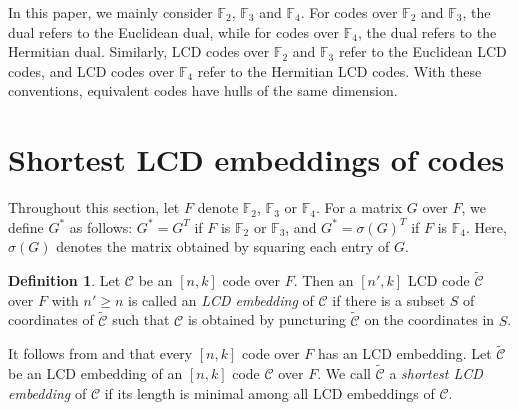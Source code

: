 \documentclass{article}
\theoremstyle{definition}
\newtheorem{definition}{Definition}[section]
\theoremstyle{remark}
\begin{document}
In this paper, we mainly consider $\mathbb{F}_2$, $\mathbb{F}_3$ and $\mathbb{F}_4$. For codes over $\mathbb{F}_2$ and $\mathbb{F}_3$, the dual refers to the Euclidean dual, while for codes over $\mathbb{F}_4$, the dual refers to the Hermitian dual. Similarly, LCD codes over $\mathbb{F}_2$ and $\mathbb{F}_3$ refer to the Euclidean LCD codes, and LCD codes over $\mathbb{F}_4$ refer to the Hermitian LCD codes. With these conventions, equivalent codes have hulls of the same dimension.


\section{Shortest LCD embeddings of codes}


Throughout this section, let $F$ denote $\mathbb{F}_2$, $\mathbb{F}_3$ or $\mathbb{F}_4$. For a matrix $G$ over $F$, we define $G^*$ as follows: $G^*=G^T$ if $F$ is $\mathbb{F}_2$ or $\mathbb{F}_3$, and $G^*=\sigma(G)^T$ if $F$ is $\mathbb{F}_4$. Here, $\sigma(G)$ denotes the matrix obtained by squaring each entry of $G$.

\begin{definition}
    Let $\mathcal{C}$ be an $[n, k]$ code over $F$. Then an $[n', k]$ LCD code $\tilde{\mathcal{C}}$ over $F$ with $n'\ge n$ is called an \textit{LCD embedding} of $\mathcal{C}$ if there is a subset $S$ of coordinates of $\tilde{\mathcal{C}}$ such that $\mathcal{C}$ is obtained by puncturing $\tilde{\mathcal{C}}$ on the coordinates in $S$.
\end{definition}

It follows from \cite[Theorem 15]{Liu-LCD-class} and \cite[Proposition 2]{Massey-LCD-code} that every $[n,k]$ code over $F$ has an LCD embedding. Let $\tilde{\mathcal{C}}$ be an LCD embedding of an $[n, k]$ code $\mathcal{C}$ over $F$. We call $\tilde{\mathcal{C}}$ a \textit{shortest LCD embedding} of $\mathcal{C}$ if its length is minimal among all LCD embeddings of $\mathcal{C}$.
\end{document}
